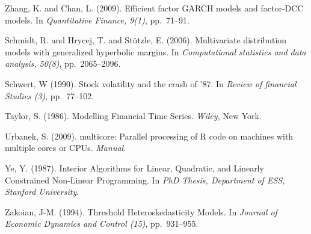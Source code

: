 \begin{thebibliography}{}
Zhang, K. and Chan, L. (2009).
\newblock Efficient factor GARCH models and factor-DCC models.
\newblock In \emph{Quantitative Finance, 9(1)}, pp.~71--91.

Schmidt, R. and Hrycej, T. and St{\"{u}}tzle, E. (2006).
\newblock Multivariate distribution models with generalized hyperbolic margins.
\newblock In \emph{Computational statistics and data analysis, 50(8)}, pp.~2065--2096.

Schwert, W (1990).
\newblock Stock volatility and the crash of '87.
\newblock In \emph{Review of financial Studies (3)}, pp.~77--102.

Taylor, S. (1986).
\newblock Modelling Financial Time Series.
\newblock \emph{Wiley}, New York.

Urbanek, S. (2009).
\newblock multicore: Parallel processing of R code on machines with multiple cores or CPUs.
\newblock \emph{Manual}.

Ye, Y. (1987).
\newblock Interior Algorithms for Linear, Quadratic, and Linearly Constrained Non-Linear Programming.
\newblock In \emph{PhD Thesis, Department of {ESS}, Stanford University}.

Zakoian, J-M. (1994).
\newblock Threshold Heteroskedasticity Models.
\newblock In \emph{Journal of Economic Dynamics and Control (15)}, pp.~931--955.

\end{thebibliography} 